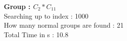 \textbf{Group : $C_2*C_{11}$}\\
Searching up to index : 1000\\
How many normal groups are found : 21\\
Total Time in s : 10.8\\
